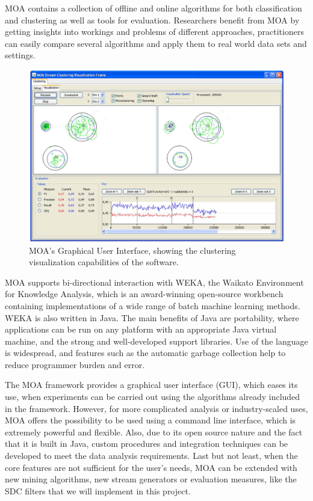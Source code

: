 MOA contains a collection of offline and online algorithms for both classification and clustering as well as tools for evaluation. Researchers benefit from MOA by getting insights into workings and problems of different approaches, practitioners can easily compare several algorithms and apply them to real world data sets and settings.

\begin{figure}
\centering
\includegraphics[width=0.8\linewidth]{figures/moa-gui-2.png}
\caption[MOA's Graphical User Interface]{MOA's Graphical User Interface, showing the clustering visualization capabilities of the software.}
\end{figure}

MOA supports bi-directional interaction with WEKA, the Waikato Environment for Knowledge Analysis, which is an award-winning open-source workbench containing implementations of a wide range of batch machine learning methods. WEKA is also written in Java. The main benefits of Java are portability, where applications can be run on any platform with an appropriate Java virtual machine, and the strong and well-developed support libraries. Use of the language is widespread, and features such as the automatic garbage collection help to reduce programmer burden and error.

The MOA framework provides a graphical user interface (GUI), which eases its use, when experiments can be carried out using the algorithms already included in the framework. However, for more complicated analysis or industry-scaled uses, MOA offers the possibility to be used using a command line interface, which is extremely powerful and flexible. Also, due to its open source nature and the fact that it is built in Java, custom procedures and integration techniques can be developed to meet the data analysis requirements. Last but not least, when the core features are not sufficient for the user's needs, MOA can be extended with new mining algorithms, new stream generators or evaluation measures, like the SDC filters that we will implement in this project.